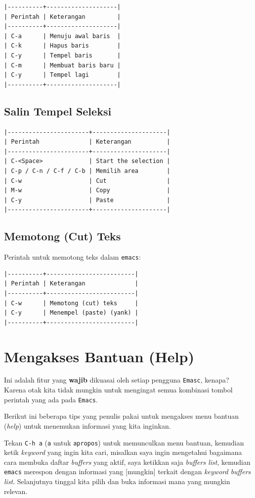 \documentclass{article}
\begin{document}
\begin{verbatim}
|----------+--------------------|
| Perintah | Keterangan         |
|----------+--------------------|
| C-a      | Menuju awal baris  |
| C-k      | Hapus baris        |
| C-y      | Tempel baris       |
| C-m      | Membuat baris baru |
| C-y      | Tempel lagi        |
|----------+--------------------|
\end{verbatim}

\subsection{Salin Tempel Seleksi}

\begin{verbatim}
|-----------------------+---------------------|
| Perintah              | Keterangan          |
|-----------------------+---------------------|
| C-<Space>             | Start the selection |
| C-p / C-n / C-f / C-b | Memilih area        |
| C-w                   | Cut                 |
| M-w                   | Copy                |
| C-y                   | Paste               |
|-----------------------+---------------------|
\end{verbatim}

\subsection{Memotong (Cut) Teks}

Perintah untuk memotong teks dalam \verb=emacs=:

\begin{verbatim}
|----------+-------------------------|
| Perintah | Keterangan              |
|----------+-------------------------|
| C-w      | Memotong (cut) teks     |
| C-y      | Menempel (paste) (yank) |
|----------+-------------------------|
\end{verbatim}

\section{Mengakses Bantuan (Help)}
Ini adalah fitur yang \textbf{wajib} dikuasai oleh setiap pengguna 
\verb=Emasc=, kenapa? Karena otak kita tidak mungkin untuk mengingat
semua kombinasi tombol perintah yang ada pada \verb=Emacs=.

Berikut ini beberapa tips yang penulis pakai untuk mengakses menu bantuan
(\emph{help}) untuk menemukan informasi yang kita inginkan.

Tekan \verb=C-h a= (\verb=a= untuk \verb=apropos=) untuk memunculkan 
menu bantuan, kemudian ketik \emph{keyword} yang ingin kita cari, 
misalkan saya ingin mengetahui bagaimana cara membuka daftar 
\emph{buffers} yang aktif, saya ketikkan saja \emph{buffers list}, 
kemudian \verb=emacs= merespon dengan informasi yang [mungkin] terkait 
dengan \emph{keyword buffers list}. Selanjutnya tinggal kita pilih dan
buka informasi mana yang mungkin relevan.
\end{document}
